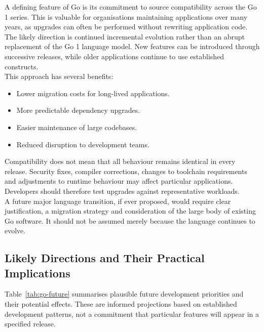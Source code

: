 A defining feature of Go is its commitment to source compatibility across the Go 1 series. This is valuable for organisations maintaining applications over many years, as upgrades can often be performed without rewriting application code.\\

The likely direction is continued incremental evolution rather than an abrupt replacement of the Go 1 language model. New features can be introduced through successive releases, while older applications continue to use established constructs.\\

This approach has several benefits:

\begin{itemize}
    \item Lower migration costs for long-lived applications.
    \item More predictable dependency upgrades.
    \item Easier maintenance of large codebases.
    \item Reduced disruption to development teams.
\end{itemize}

Compatibility does not mean that all behaviour remains identical in every release. Security fixes, compiler corrections, changes to toolchain requirements and adjustments to runtime behaviour may affect particular applications. Developers should therefore test upgrades against representative workloads.\\

A future major language transition, if ever proposed, would require clear justification, a migration strategy and consideration of the large body of existing Go software. It should not be assumed merely because the language continues to evolve.

\subsection{Likely Directions and Their Practical Implications}

Table~\ref{tab:go-future} summarises plausible future development priorities and their potential effects. These are informed projections based on established development patterns, not a commitment that particular features will appear in a specified release.

